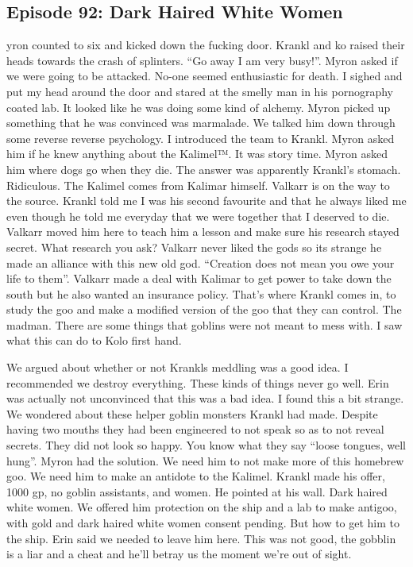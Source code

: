 \subsection{Episode 92: Dark Haired White Women}

yron counted to six and kicked down the fucking door. Krankl and ko raised their heads towards the crash of splinters. “Go away I am very busy!”. Myron asked if we were going to be attacked. No-one seemed enthusiastic for death. I sighed and put my head around the door and stared at the smelly man in his pornography coated lab. It looked like he was doing some kind of alchemy. Myron picked up something that he was convinced was marmalade. We talked him down through some reverse reverse psychology. I introduced the team to Krankl. Myron asked him if he knew anything about the Kalimel™. It was story time. Myron asked him where dogs go when they die. The answer was apparently Krankl’s stomach. Ridiculous. The Kalimel comes from Kalimar himself. Valkarr is on the way to the source. Krankl told me I was his second favourite and that he always liked me even though he told me everyday that we were together that I deserved to die. Valkarr moved him here to teach him a lesson and make sure his research stayed secret. What research you ask? Valkarr never liked the gods so its strange he made an alliance with this new old god. “Creation does not mean you owe your life to them”. Valkarr made a deal with Kalimar to get power to take down the south but he also wanted an insurance policy. That’s where Krankl comes in, to study the goo and make a modified version of the goo that they can control. The madman. There are some things that goblins were not meant to mess with. I saw what this can do to Kolo first hand.\medskip

We argued about whether or not Krankls meddling was a good idea. I recommended we destroy everything. These kinds of things never go well. Erin was actually not unconvinced that this was a bad idea. I found this a bit strange. We wondered about these helper goblin monsters Krankl had made. Despite having two mouths they had been engineered to not speak so as to not reveal secrets. They did not look so happy. You know what they say “loose tongues, well hung”. Myron had the solution. We need him to not make more of this homebrew goo. We need him to make an antidote to the Kalimel. Krankl made his offer, 1000 gp, no goblin assistants, and women. He pointed at his wall. Dark haired white women. We offered him protection on the ship and a lab to make antigoo, with gold and dark haired white women consent pending. But how to get him to the ship. Erin said we needed to leave him here. This was not good, the gobblin is a liar and a cheat and he’ll betray us the moment we’re out of sight.\medskip

